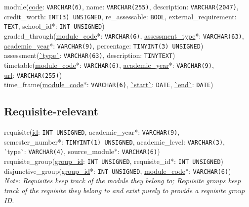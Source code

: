 module(\underline{code}: \texttt{VARCHAR(6)},
name: \texttt{VARCHAR(255)},
description: \texttt{VARCHAR(2047)},
credit\_worth: \texttt{INT(3) UNSIGNED},
re\_assessable: \texttt{BOOL},
external\_requirement: \texttt{TEXT},
school\_id*: \texttt{INT UNSIGNED})
\\

graded\_through(\underline{module\_code}*: \texttt{VARCHAR(6)},
\underline{assessment\_type}*: \texttt{VARCHAR(63)},
\underline{academic\_year}*: \texttt{VARCHAR(9)},
percentage: \texttt{TINYINT(3) UNSIGNED})
\\

assessment(\underline{\`{}type\`{}}: \texttt{VARCHAR(63)},
description: \texttt{TINYTEXT})
\\

timetable(\underline{module\_code}*: \texttt{VARCHAR(6)},
\underline{academic\_year}*: \texttt{VARCHAR(9)},\\
\underline{url}: \texttt{VARCHAR(255)})
\\

time\_frame(\underline{module\_code}*: \texttt{VARCHAR(6)},
\underline{\`{}start\`{}}: \texttt{DATE},
\underline{\`{}end\`{}}: \texttt{DATE})

    \subsection{Requisite-relevant}
    requisite(\underline{id}: \texttt{INT UNSIGNED},
    academic\_year*: \texttt{VARCHAR(9)},\\
    semester\_number*: \texttt{TINYINT(1) UNSIGNED},
    academic\_level: \texttt{VARCHAR(3)},\\
    \`{}type\`{}: \texttt{VARCHAR(4)},
    source\_module*: \texttt{VARCHAR(6)})
    \\
    
    requisite\_group(\underline{group\_id}: \texttt{INT UNSIGNED},
    requisite\_id*: \texttt{INT UNSIGNED})
    \\
    
    disjunctive\_group(\underline{group\_id}*: \texttt{INT UNSIGNED},
    \underline{module\_code}*: \texttt{VARCHAR(6)})
    \\
    
    \textit{Note: Requisites keep track of the module they belong to; Requisite
    groups keep track of the requisite they belong to and exist purely to
    provide a requisite group ID.}

    \pagebreak

